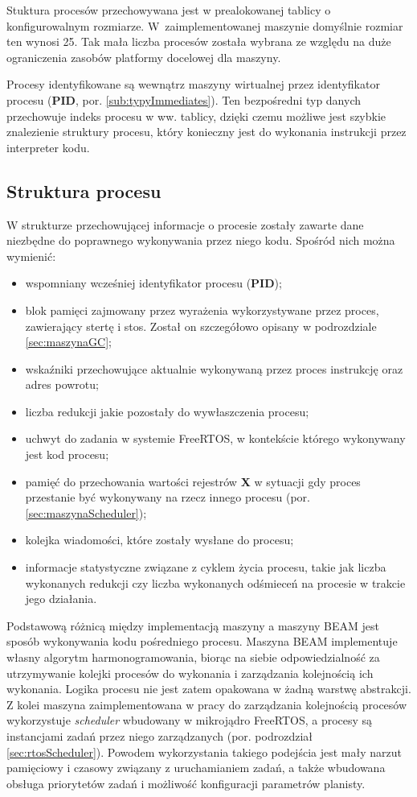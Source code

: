 Stuktura procesów przechowywana jest w prealokowanej tablicy o konfigurowalnym rozmiarze.
W~zaimplementowanej maszynie domyślnie rozmiar ten wynosi 25.
Tak mała liczba procesów została wybrana ze względu na duże ograniczenia zasobów platformy docelowej dla maszyny.

Procesy identyfikowane są wewnątrz maszyny wirtualnej przez identyfikator procesu (\textbf{PID}, por. \ref{sub:typyImmediates}).
Ten bezpośredni typ danych przechowuje indeks procesu w ww. tablicy, dzięki czemu możliwe jest szybkie znalezienie struktury procesu, który konieczny jest do wykonania instrukcji przez interpreter kodu.

\subsection{Struktura procesu}
\label{sub:procStruktura}

W strukturze przechowującej informacje o procesie zostały zawarte dane niezbędne do poprawnego wykonywania przez niego kodu.
Spośród nich można wymienić:
\begin{itemize}
\item wspomniany wcześniej identyfikator procesu (\textbf{PID});
\item blok pamięci zajmowany przez wyrażenia wykorzystywane przez proces, zawierający stertę i stos. Został on szczegółowo opisany w podrozdziale \ref{sec:maszynaGC};
\item wskaźniki przechowujące aktualnie wykonywaną przez proces instrukcję oraz adres powrotu;
\item liczba redukcji jakie pozostały do wywłaszczenia procesu;
\item uchwyt do zadania w systemie FreeRTOS, w kontekście którego wykonywany jest kod procesu;
\item pamięć do przechowania wartości rejestrów \textbf{X} w sytuacji gdy proces przestanie być wykonywany na rzecz innego procesu (por. \ref{sec:maszynaScheduler});
\item kolejka wiadomości, które zostały wysłane do procesu;
\item informacje statystyczne związane z cyklem życia procesu, takie jak liczba wykonanych redukcji czy liczba wykonanych odśmieceń na procesie w trakcie jego działania.
\end{itemize}

Podstawową różnicą między implementacją maszyny a maszyny BEAM jest sposób wykonywania kodu pośredniego procesu.
Maszyna BEAM implementuje własny algorytm harmonogramowania, biorąc na siebie odpowiedzialność za utrzymywanie kolejki procesów do wykonania i zarządzania kolejnością ich wykonania. Logika procesu nie jest zatem opakowana w żadną warstwę abstrakcji. 
Z kolei maszyna zaimplementowana w pracy do zarządzania kolejnością procesów wykorzystuje \emph{scheduler} wbudowany w mikrojądro FreeRTOS, a procesy są instancjami zadań przez niego zarządzanych (por. podrozdział \ref{sec:rtosScheduler}).
Powodem wykorzystania takiego podejścia jest mały narzut pamięciowy i czasowy związany z uruchamianiem zadań, a także wbudowana obsługa priorytetów zadań i możliwość konfiguracji parametrów planisty.

